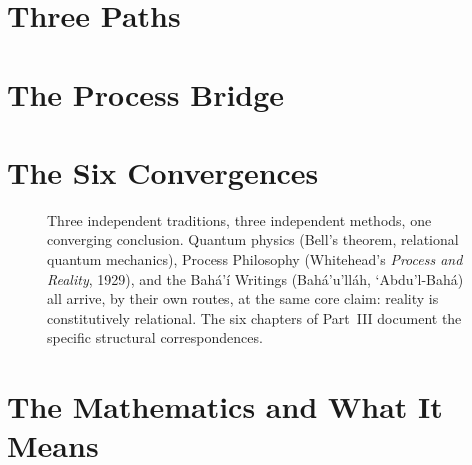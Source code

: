 \documentclass[titlepage]{book}
\begin{document}

\frontmatter



\tableofcontents

\mainmatter

\part{Three Paths}




\part{The Process Bridge}




\part{The Six Convergences}\label{part:convergences}

\begin{figure}[htbp]
  \centering
  \resizebox{0.85\linewidth}{!}{}
  \caption[Three traditions, one structure]{Three independent traditions, three independent methods, one converging conclusion. Quantum physics (Bell's theorem, relational quantum mechanics), Process Philosophy (Whitehead's \textit{Process and Reality}, 1929), and the Bahá'í Writings (Bahá'u'lláh, `Abdu'l-Bahá) all arrive, by their own routes, at the same core claim: reality is constitutively relational. The six chapters of Part~III document the specific structural correspondences.}
  \label{fig:convergence-triangle}
\end{figure}








\part{The Mathematics and What It Means}





\backmatter

\end{document}
